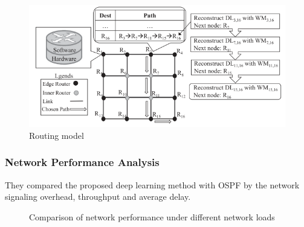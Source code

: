 \documentclass[11pt]{report}
\begin{document}
	\begin{figure}[h!]
		\centering
		\includegraphics[width=0.5\linewidth]{figure4.png}
		\caption{Routing model}
		\label{4thfig}
	\end{figure}
	
	\subsubsection{Network Performance Analysis}
	They compared the proposed deep learning method with OSPF by the network signaling overhead, throughput and average delay. 
	\begin{figure}[!htbp]
	\centering
	\caption{Comparison of network performance under different network loads}
	\end{figure}
	
\end{document}
